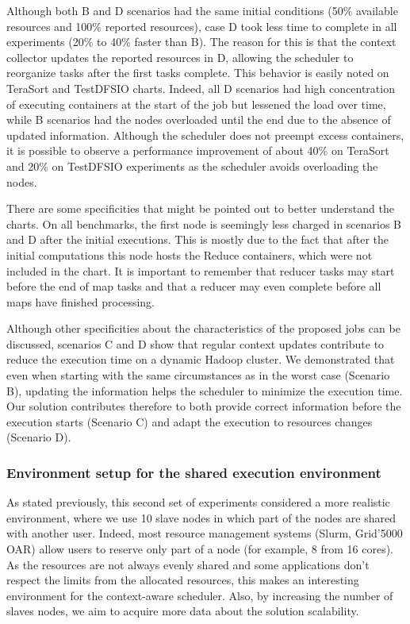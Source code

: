 Although both B and D scenarios had the same initial conditions (50\% available resources and 100\% reported resources), case D took less time to complete in all experiments (20\% to 40\% faster than B). The reason for this is that the context collector updates the reported resources in D, allowing the scheduler to reorganize tasks after the first tasks complete. This behavior is easily noted on TeraSort and TestDFSIO charts. Indeed, all D scenarios had high concentration of executing containers at the start of the job but lessened the load over time, while B scenarios had the nodes overloaded until the end due to the absence of updated information. Although the scheduler does not preempt excess containers, it is possible to observe a performance improvement of about 40\% on TeraSort and 20\% on TestDFSIO experiments as the scheduler avoids overloading the nodes.

There are some specificities that might be pointed out to better understand the charts. On all benchmarks, the first node is seemingly less charged in scenarios B and D after the initial executions. This is mostly due to the fact that after the initial computations this node hosts the Reduce containers, which were not included in the chart. It is important to remember that reducer tasks may start before the end of map tasks and that a reducer may even complete before all maps have finished processing. 

Although other specificities about the characteristics of the proposed jobs can be discussed, scenarios C and D show that regular context updates contribute to reduce the execution time on a dynamic Hadoop cluster. We demonstrated that even when starting with the same circumstances as in the worst case (Scenario B), updating the information helps the scheduler to minimize the execution time. Our solution contributes therefore to both provide correct information before the execution starts (Scenario C) and adapt the execution to resources changes (Scenario D). 

\subsubsection*{Environment setup for the shared execution environment\label{sec:5.5}}

As stated previously, this second set of experiments considered a more realistic environment, where we use 10 slave nodes in which part of the nodes are shared with another user. Indeed, most resource management systems (Slurm, Grid'5000 OAR) allow users to reserve only part of a node (for example, 8 from 16 cores). As the resources are not always evenly shared and some applications don't respect the limits from the allocated resources, this makes an interesting environment for the context-aware scheduler. Also, by increasing the number of slaves nodes, we aim to acquire more data about the solution scalability. 

